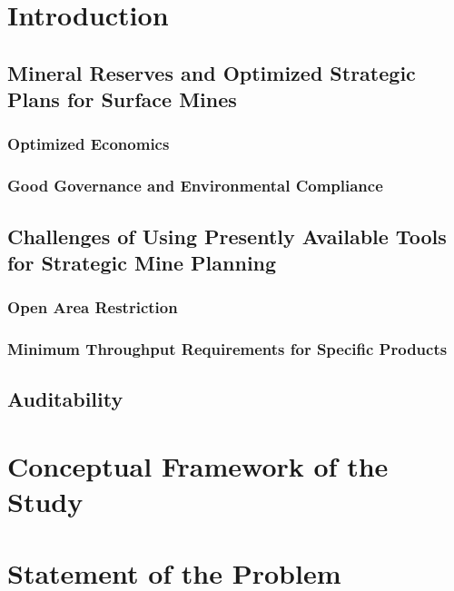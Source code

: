 \documentclass[12pt]{report}
\begin{document}

\section{Introduction}

\subsection{Mineral Reserves and Optimized Strategic Plans for Surface Mines}

\subsubsection{Optimized Economics}

\subsubsection{Good Governance and Environmental Compliance}

\subsection{Challenges of Using Presently Available Tools for Strategic Mine Planning}


\subsubsection{Open Area Restriction}

\subsubsection{Minimum Throughput Requirements for Specific Products}

\subsection{Auditability}

\section{Conceptual Framework of the Study}

\section{Statement of the Problem}
\end{document}
